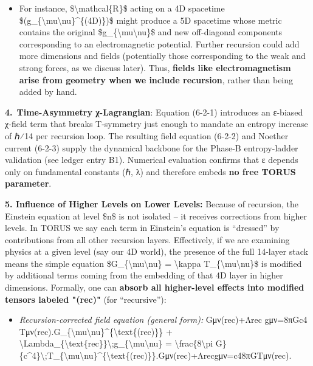 \begin{itemize}
\item
  For instance, \$\textbackslash{}mathcal\{R\}\$ acting on a 4D
  spacetime
  \$(g\_\{\textbackslash{}mu\textbackslash{}nu\}\^{}\{(4D)\})\$ might
  produce a 5D spacetime whose metric contains the original
  \$g\_\{\textbackslash{}mu\textbackslash{}nu\}\$ and new off-diagonal
  components corresponding to an electromagnetic potential. Further
  recursion could add more dimensions and fields (potentially those
  corresponding to the weak and strong forces, as we discuss later).
  Thus, \textbf{fields like electromagnetism arise from geometry when we
  include recursion}, rather than being added by hand.
\end{itemize}

\textbf{4. Time-Asymmetry χ-Lagrangian}: Equation (6-2-1) introduces an
ε-biased χ-field term that breaks T-symmetry just enough to mandate an
entropy increase of ℏ⁄14 per recursion loop. The resulting field
equation (6-2-2) and Noether current (6-2-3) supply the dynamical
backbone for the Phase-B entropy-ladder validation (see ledger entry
B1). Numerical evaluation confirms that ε depends only on fundamental
constants (ℏ, λ) and therefore embeds \textbf{no free TORUS parameter}.

\textbf{5. Influence of Higher Levels on Lower Levels:} Because of
recursion, the Einstein equation at level \$n\$ is not isolated -- it
receives corrections from higher levels. In TORUS we say each term in
Einstein's equation is ``dressed'' by contributions from all other
recursion layers​. Effectively, if we are examining physics at a given
level (say our 4D world), the presence of the full 14-layer stack means
the simple equation \$G\_\{\textbackslash{}mu\textbackslash{}nu\} =
\textbackslash{}kappa T\_\{\textbackslash{}mu\textbackslash{}nu\}\$ is
modified by additional terms coming from the embedding of that 4D layer
in higher dimensions. Formally, one can \textbf{absorb all higher-level
effects into modified tensors labeled "(rec)"} (for ``recursive'')​:

\begin{itemize}
\item
  \emph{Recursion-corrected field equation (general form):}
  Gμν(rec)+Λrec  gμν=8πGc4  Tμν(rec).G\_\{\textbackslash{}mu\textbackslash{}nu\}\^{}\{\textbackslash{}text\{(rec)\}\}
  +
  \textbackslash{}Lambda\_\{\textbackslash{}text\{rec\}\}\textbackslash{};g\_\{\textbackslash{}mu\textbackslash{}nu\}
  = \textbackslash{}frac\{8\textbackslash{}pi
  G\}\{c\^{}4\}\textbackslash{};T\_\{\textbackslash{}mu\textbackslash{}nu\}\^{}\{\textbackslash{}text\{(rec)\}\}.Gμν(rec)​+Λrec​gμν​=c48πG​Tμν(rec)​.
\end{itemize}

